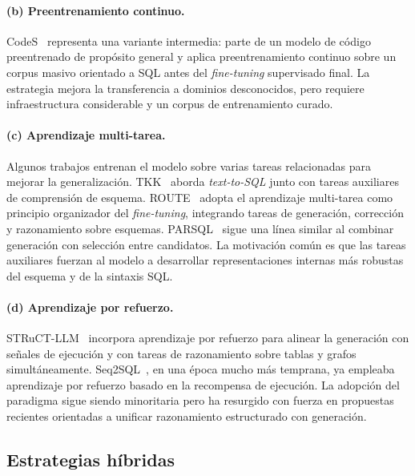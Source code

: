 \paragraph{(b) Preentrenamiento continuo.} CodeS~\cite{CodeS2024} representa
una variante intermedia: parte de un modelo de código preentrenado de
propósito general y aplica preentrenamiento continuo sobre un corpus
masivo orientado a SQL antes del \emph{fine-tuning} supervisado final. La
estrategia mejora la transferencia a dominios desconocidos, pero requiere
infraestructura considerable y un corpus de entrenamiento curado.

\paragraph{(c) Aprendizaje multi-tarea.} Algunos trabajos entrenan el modelo
sobre varias tareas relacionadas para mejorar la generalización.
TKK~\cite{TKK2022} aborda \emph{text-to-SQL} junto con tareas auxiliares
de comprensión de esquema. ROUTE~\cite{ROUTE2025} adopta el aprendizaje
multi-tarea como principio organizador del \emph{fine-tuning},
integrando tareas de generación, corrección y razonamiento sobre esquemas.
PARSQL~\cite{PARSQL2025} sigue una línea similar al combinar generación con
selección entre candidatos. La motivación común es que las tareas auxiliares
fuerzan al modelo a desarrollar representaciones internas más robustas del
esquema y de la sintaxis SQL.

\paragraph{(d) Aprendizaje por refuerzo.} STRuCT-LLM~\cite{STRuCT-LLM2025}
incorpora aprendizaje por refuerzo para alinear la generación con
señales de ejecución y con tareas de razonamiento sobre tablas y grafos
simultáneamente. Seq2SQL~\cite{Seq2SQL2017}, en una época mucho más
temprana, ya empleaba aprendizaje por refuerzo basado en la recompensa de
ejecución. La adopción del paradigma sigue siendo minoritaria pero ha
resurgido con fuerza en propuestas recientes orientadas a unificar
razonamiento estructurado con generación.

\subsection{Estrategias híbridas}
\label{subsec:sota-d1-hibridas}

